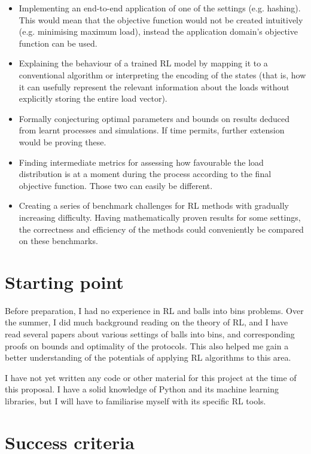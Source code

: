 \documentclass[11pt,a4paper]{article}
\begin{document}
\begin{itemize}
    \item
    Implementing an end-to-end application of one of the settings (e.g. hashing). This would mean that the objective function would not be created intuitively (e.g. minimising maximum load), instead the application domain's objective function can be used.
    \item
    Explaining the behaviour of a trained RL model by mapping it to a conventional algorithm or interpreting the encoding of the states (that is, how it can usefully represent the relevant information about the loads without explicitly storing the entire load vector).
    \item
    Formally conjecturing optimal parameters and bounds on results deduced from learnt processes and simulations. If time permits, further extension would be proving these.
    \item
    Finding intermediate metrics for assessing how favourable the load distribution is at a moment during the process according to the final objective function. Those two can easily be different.
    \item
    Creating a series of benchmark challenges for RL methods with gradually increasing difficulty. Having mathematically proven results for some settings, the correctness and efficiency of the methods could conveniently be compared on these benchmarks.
\end{itemize}

\section{Starting point}

Before preparation, I had no experience in RL and balls into bins problems. Over the summer, I did much background reading on the theory of RL, and I have read several papers about various settings of balls into bins, and corresponding proofs on bounds and optimality of the protocols. This also helped me gain a better understanding of the potentials of applying RL algorithms to this area.

I have not yet written any code or other material for this project at the time of this proposal. I have a solid knowledge of Python and its machine learning libraries, but I will have to familiarise myself with its specific RL tools.

\section{Success criteria}
\end{document}

